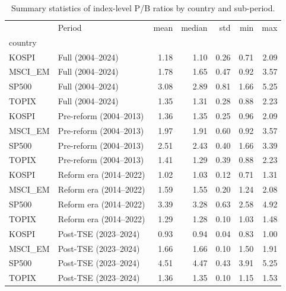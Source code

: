 \begin{table}
\caption{Summary statistics of index-level P/B ratios by country and sub-period.}
\label{tab:summary_stats}
\begin{tabular}{llrrrrr}
\toprule
 & Period & mean & median & std & min & max \\
country &  &  &  &  &  &  \\
\midrule
KOSPI & Full (2004--2024) & 1.18 & 1.10 & 0.26 & 0.71 & 2.09 \\
MSCI_EM & Full (2004--2024) & 1.78 & 1.65 & 0.47 & 0.92 & 3.57 \\
SP500 & Full (2004--2024) & 3.08 & 2.89 & 0.81 & 1.66 & 5.25 \\
TOPIX & Full (2004--2024) & 1.35 & 1.31 & 0.28 & 0.88 & 2.23 \\
KOSPI & Pre-reform (2004--2013) & 1.36 & 1.35 & 0.25 & 0.96 & 2.09 \\
MSCI_EM & Pre-reform (2004--2013) & 1.97 & 1.91 & 0.60 & 0.92 & 3.57 \\
SP500 & Pre-reform (2004--2013) & 2.51 & 2.43 & 0.40 & 1.66 & 3.39 \\
TOPIX & Pre-reform (2004--2013) & 1.41 & 1.29 & 0.39 & 0.88 & 2.23 \\
KOSPI & Reform era (2014--2022) & 1.02 & 1.03 & 0.12 & 0.71 & 1.31 \\
MSCI_EM & Reform era (2014--2022) & 1.59 & 1.55 & 0.20 & 1.24 & 2.08 \\
SP500 & Reform era (2014--2022) & 3.39 & 3.28 & 0.63 & 2.58 & 4.92 \\
TOPIX & Reform era (2014--2022) & 1.29 & 1.28 & 0.10 & 1.03 & 1.48 \\
KOSPI & Post-TSE (2023--2024) & 0.93 & 0.94 & 0.04 & 0.83 & 1.00 \\
MSCI_EM & Post-TSE (2023--2024) & 1.66 & 1.66 & 0.10 & 1.50 & 1.91 \\
SP500 & Post-TSE (2023--2024) & 4.51 & 4.47 & 0.43 & 3.91 & 5.25 \\
TOPIX & Post-TSE (2023--2024) & 1.36 & 1.35 & 0.10 & 1.15 & 1.53 \\
\bottomrule
\end{tabular}
\end{table}
